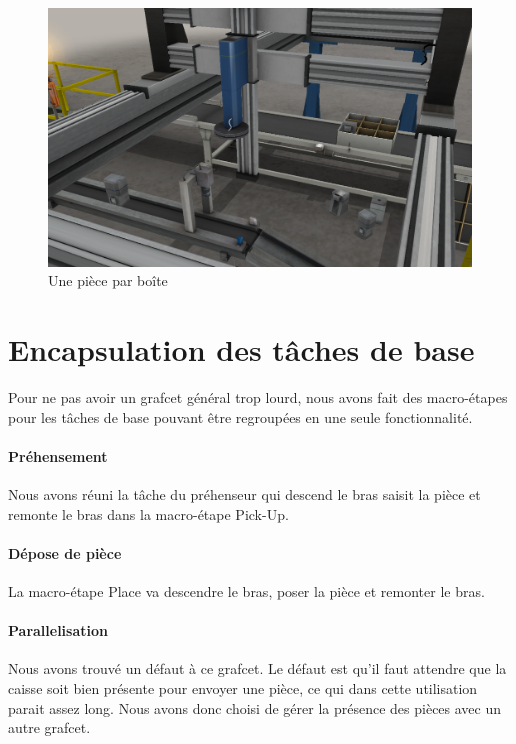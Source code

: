 \documentclass[oneside,a4paper,12pt]{article}
\begin{document}
	\begin{figure}[h]
		\centering
		\includegraphics[width=12cm]{placementUnePiece.PNG}
		\caption{Une pièce par boîte}
	\end{figure}
	
	\section{Encapsulation des tâches de base}
	Pour ne pas avoir un grafcet général trop lourd, nous avons fait des macro-étapes pour les tâches de base pouvant être regroupées en une seule fonctionnalité.
	
		\paragraph{Préhensement}
		
		Nous avons réuni la tâche du préhenseur qui descend le bras saisit la pièce et remonte le bras dans la macro-étape Pick-Up.
	
		\paragraph{Dépose de pièce}
		
		La macro-étape Place va descendre le bras, poser la pièce et remonter le bras.
		
		\paragraph{Parallelisation}
		
		Nous avons trouvé un défaut à ce grafcet. Le défaut est qu’il faut attendre que la caisse soit bien présente pour envoyer une pièce, ce qui dans cette utilisation parait assez long. Nous avons donc choisi de gérer la présence des pièces avec un autre grafcet.
		
\end{document}
